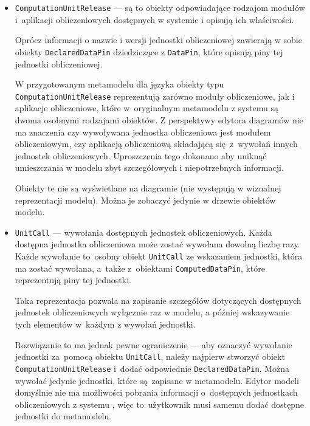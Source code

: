 \begin{itemize}
	\item \texttt{ComputationUnitRelease} --- są to obiekty odpowiadające
	      rodzajom modułów i~aplikacji obliczeniowych dostępnych w systemie
	      \BalticLSC{} i opisują ich właściwości.

	      Oprócz informacji o nazwie i wersji jednostki obliczeniowej
	      zawierają w sobie obiekty \texttt{DeclaredDataPin} dziedziczące z
	      \texttt{DataPin}, które opisują piny tej jednostki obliczeniowej.

	      W przygotowanym metamodelu dla języka \CAL{} obiekty typu
	      \texttt{Computation\-Unit\-Release} reprezentują zarówno moduły
	      obliczeniowe,
	      jak i aplikacje obliczeniowe, które w~oryginalnym metamodelu z
	      systemu
	      \BalticLSC{} są dwoma osobnymi rodzajami obiektów. Z perspektywy
	      edytora
	      diagramów nie ma znaczenia czy wywoływana jednostka obliczeniowa
	      jest modułem
	      obliczeniowym, czy aplikacją obliczeniową składającą
	      się~z~wywołań innych
	      jednostek obliczeniowych. Uproszczenia tego dokonano aby uniknąć
	      umieszczania w
	      modelu zbyt szczegółowych i niepotrzebnych informacji.

	      Obiekty te nie są wyświetlane na diagramie (nie występują w
	      wizualnej reprezentacji modelu). Można je zobaczyć jedynie w
	      drzewie obiektów
	      modelu.

	\item \texttt{UnitCall} --- wywołania dostępnych jednostek
	      obliczeniowych. Każda dostępna jednostka obliczeniowa może zostać
	      wywołana dowolną liczbę razy. Każde wywołanie to~osobny obiekt
	      \texttt{UnitCall} ze wskazaniem jednostki, która ma zostać
	      wywołana, a~także
	      z~obiektami \texttt{ComputedDataPin}, które reprezentują piny tej
	      jednostki.

	      Taka reprezentacja pozwala na zapisanie szczegółów dotyczących
	      dostępnych jednostek obliczeniowych wyłącznie raz w modelu, a
	      później
	      wskazywanie tych elementów w~każdym z wywołań jednostki.

	      Rozwiązanie to ma jednak pewne ograniczenie --- aby oznaczyć
	      wywołanie jednostki za~pomocą obiektu \texttt{UnitCall}, należy
	      najpierw
	      stworzyć obiekt \texttt{Computation\-Unit\-Release} i~dodać
	      odpowiednie
	      \texttt{Declared\-Data\-Pin}. Można wywołać jedynie jednostki,
	      które
	      są~zapisane w metamodelu. Edytor modeli domyślnie nie ma
	      możliwości pobrania
	      informacji o~dostępnych jednostkach obliczeniowych z systemu
	      \BalticLSC{}, więc
	      to~użytkownik musi samemu dodać dostępne jednostki do metamodelu.


\end{itemize}
